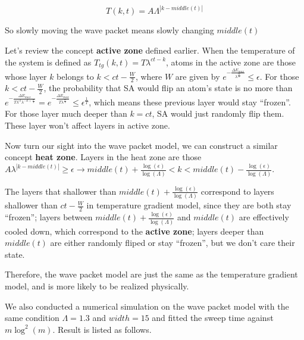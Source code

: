 \documentclass[twocolumn,superscriptaddress,english,showpacs,longbibliography]{revtex4-2}
\begin{document}
\[
T(k,t) = A\Lambda^{|k-middle(t)|}
\]

So slowly moving the wave packet means slowly changing $middle(t)$

Let's review the concept \textbf{active zone} defined earlier. When the
temperature of the system is defined as
$T_{tg}(k, t) = T\lambda^{ct-k}$, atoms in the active zone are those
whose layer $k$ belongs to $k<ct - \frac{W}{2}$, where $W$ are
given by
$e^{-\frac{\Delta E_{max}}{\lambda^{\frac{W}{2}}}}\leq \epsilon$. For
those $k<ct - \frac{W}{2}$, the probability that SA would flip an
atom's state is no more than
$e^{-\frac{\Delta E_{max}}{T\lambda^{ct}\lambda^{-ct + \frac{W}{2}}}}=e^{-\frac{\Delta E_{max}}{T\lambda^{\frac{W}{2}}}}\leq \epsilon^{\frac{1}{T}}$,
which means these previous layer would stay ``frozen''. For those layer
much deeper than $k = ct$, SA would just randomly flip them. These
layer won't affect layers in active zone.

Now turn our sight into the wave packet model, we can construct a
similar concept \textbf{heat zone}. Layers in the heat zone are those
$A\lambda^{|k-middle(t)|}\ge \epsilon\rightarrow middle(t) + \frac{\log(\epsilon)}{\log(\Lambda)}< k < middle(t) - \frac{\log(\epsilon)}{\log(\Lambda)}$.

The layers that shallower than
$middle(t) + \frac{\log(\epsilon)}{\log(\Lambda)}$ correspond to
layers shallower than $ct-\frac{W}{2}$ in temperature gradient model,
since they are both stay ``frozen''; layers between
$middle(t) +\frac{\log(\epsilon)}{\log(\Lambda)}$ and $middle(t)$
are effectively cooled down, which correspond to the \textbf{active
zone}; layers deeper than $middle(t)$ are either randomly fliped or
stay ``frozen'', but we don't care their state.

Therefore, the wave packet model are just the same as the temperature
gradient model, and is more likely to be realized physically.

We also conducted a numerical simulation on the wave packet model with
the same condition $\Lambda = 1.3$ and $width = 15$ and fitted the
sweep time against $m\log^2(m)$. Result is listed as follows.
\end{document}
